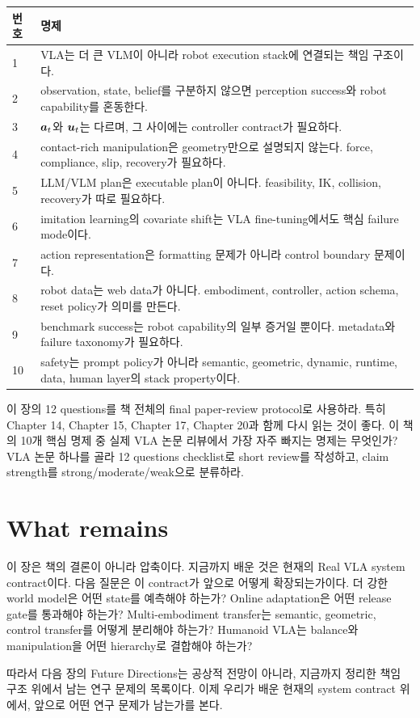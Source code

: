 \begin{center}
  \label{tab:ch21-ten-propositions}
  \begin{tabularx}{\linewidth}{p{8mm}X}
    \toprule
    번호 & 명제 \\
    \midrule
    1 & VLA는 더 큰 VLM이 아니라 robot execution stack에 연결되는 책임 구조이다. \\
    2 & observation, state, belief를 구분하지 않으면 perception success와 robot capability를 혼동한다. \\
    3 & $\bm{a}_t$와 $\bm{u}_t$는 다르며, 그 사이에는 controller contract가 필요하다. \\
    4 & contact-rich manipulation은 geometry만으로 설명되지 않는다. force, compliance, slip, recovery가 필요하다. \\
    5 & LLM/VLM plan은 executable plan이 아니다. feasibility, IK, collision, recovery가 따로 필요하다. \\
    6 & imitation learning의 covariate shift는 VLA fine-tuning에서도 핵심 failure mode이다. \\
    7 & action representation은 formatting 문제가 아니라 control boundary 문제이다. \\
    8 & robot data는 web data가 아니다. embodiment, controller, action schema, reset policy가 의미를 만든다. \\
    9 & benchmark success는 robot capability의 일부 증거일 뿐이다. metadata와 failure taxonomy가 필요하다. \\
    10 & safety는 prompt policy가 아니라 semantic, geometric, dynamic, runtime, data, human layer의 stack property이다. \\
    \bottomrule
  \end{tabularx}
\end{center}

\chapterwork
{이 장의 12 questions를 책 전체의 final paper-review protocol로 사용하라. 특히 Chapter 14, Chapter 15, Chapter 17, Chapter 20과 함께 다시 읽는 것이 좋다.}
{이 책의 10개 핵심 명제 중 실제 VLA 논문 리뷰에서 가장 자주 빠지는 명제는 무엇인가?}
{VLA 논문 하나를 골라 12 questions checklist로 short review를 작성하고, claim strength를 strong/moderate/weak으로 분류하라.}

\section{What remains}

이 장은 책의 결론이 아니라 압축이다. 지금까지 배운 것은 현재의 Real VLA system contract이다. 다음 질문은 이 contract가 앞으로 어떻게 확장되는가이다. 더 강한 world model은 어떤 state를 예측해야 하는가? Online adaptation은 어떤 release gate를 통과해야 하는가? Multi-embodiment transfer는 semantic, geometric, control transfer를 어떻게 분리해야 하는가? Humanoid VLA는 balance와 manipulation을 어떤 hierarchy로 결합해야 하는가?

따라서 다음 장의 Future Directions는 공상적 전망이 아니라, 지금까지 정리한 책임 구조 위에서 남는 연구 문제의 목록이다. 이제 우리가 배운 현재의 system contract 위에서, 앞으로 어떤 연구 문제가 남는가를 본다.
